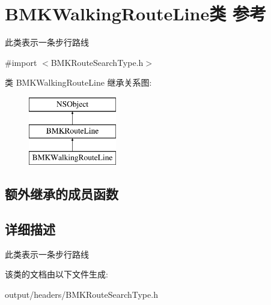\hypertarget{interface_b_m_k_walking_route_line}{}\section{B\+M\+K\+Walking\+Route\+Line类 参考}
\label{interface_b_m_k_walking_route_line}


此类表示一条步行路线  




{\ttfamily \#import $<$B\+M\+K\+Route\+Search\+Type.\+h$>$}

类 B\+M\+K\+Walking\+Route\+Line 继承关系图\+:\begin{figure}[H]
\begin{center}
\leavevmode
\includegraphics[height=3.000000cm]{interface_b_m_k_walking_route_line}
\end{center}
\end{figure}
\subsection*{额外继承的成员函数}


\subsection{详细描述}
此类表示一条步行路线 

该类的文档由以下文件生成\+:\begin{DoxyCompactItemize}
\item 
output/headers/B\+M\+K\+Route\+Search\+Type.\+h\end{DoxyCompactItemize}
